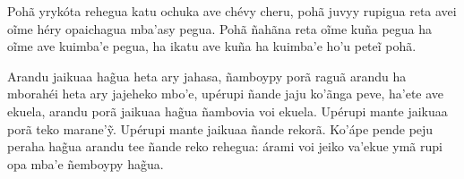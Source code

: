 Pohã yrykóta rehegua katu ochuka ave chévy cheru, pohã juvyy rupigua
reta avei oĩme héry opaichagua mba'asy pegua. Pohã ñahãna reta oĩme kuña
pegua ha oĩme ave kuimba'e pegua, ha ikatu ave kuña ha kuimba'e ho'u
peteĩ pohã.

Arandu jaikuaa hag̃ua heta ary jahasa, ñamboypy porã raguã arandu ha
mborahéi heta ary jajeheko mbo'e, upérupi ñande jaju ko'ãnga peve,
ha'ete ave ekuela, arandu porã jaikuaa hag̃ua ñambovia voi ekuela.
Upérupi mante jaikuaa porã teko marane'ỹ. Upérupi mante jaikuaa ñande
rekorã. Ko'ápe pende peju peraha hag̃ua arandu tee ñande reko rehegua:
árami voi jeiko va'ekue ymã rupi opa mba'e ñemboypy hag̃ua.